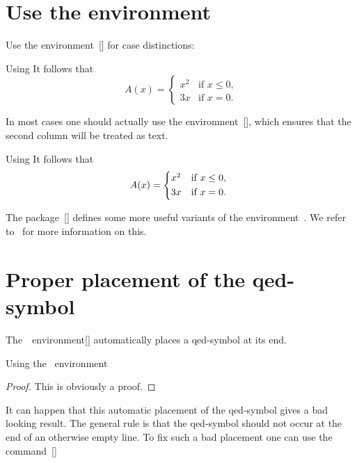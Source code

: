 \section{Use the  environment}

Use the environment~[\envname] for case distinctions:
\begin{showlatex}{Using }
It follows that
\[
  A(x)
  =
  \begin{cases}
    x^2  & \text{if $x \leq 0$,} \\
    3x   & \text{if $x = 0$.}
  \end{cases}
\]
\end{showlatex}
In most cases one should actually use the environment~[\envname], which ensures that the second column will be treated as text.
\begin{showlatex}{Using }
It follows that
\[
  A(x)
  =
  \begin{cases*}
    x^2  & if $x \leq 0$, \\
    3x   & if $x = 0$.
  \end{cases*}
\]
\end{showlatex}

The package~[\packname] defines some more useful variants of the environment~.
We refer to~\cite[3.4.3]{mathtools} for more information on this.




\section{Proper placement of the qed-symbol}


The~~environment[\envname] automatically places a qed-symbol at its end.
\begin{showlatex}{Using the ~environment}
\begin{proof}
This is obviously a proof.
\end{proof}
\end{showlatex}
It can happen that this automatic placement of the qed-symbol gives a bad looking result.
The general rule is that the qed-symbol should not occur at the end of an otherwise empty line.
To fix such a bad placement one can use the command~[\comname] 

